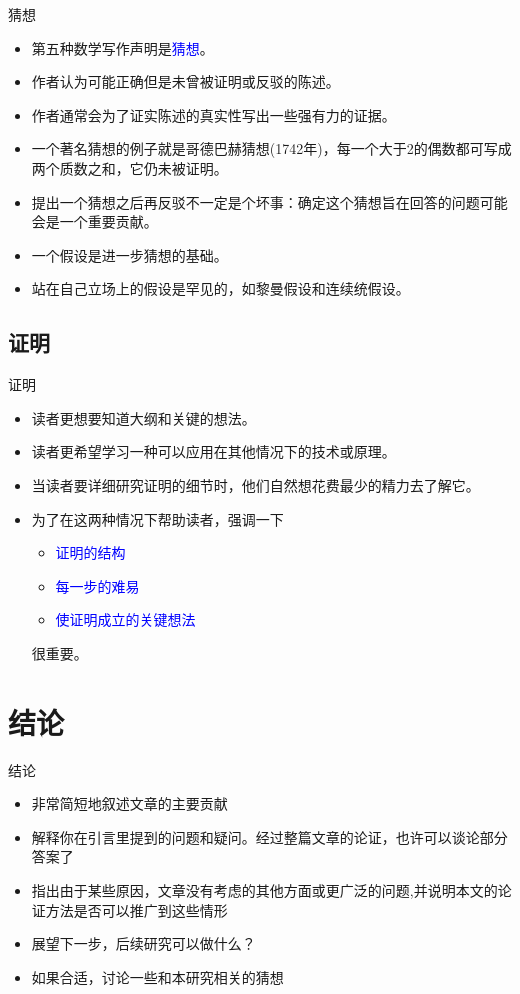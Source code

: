 \documentclass[13pt]{ctexbeamer}
\newcommand{\blue}[1]{\textcolor{blue}{#1}}
\begin{document}
\begin{frame}{猜想}
\begin{itemize}
\item 第五种数学写作声明是\blue{猜想}。
\item 作者认为可能正确但是未曾被证明或反驳的陈述。
\item 作者通常会为了证实陈述的真实性写出一些强有力的证据。
\item  一个著名猜想的例子就是哥德巴赫猜想(1742年)，每一个大于2的偶数都可写成两个质数之和，它仍未被证明。
\item 提出一个猜想之后再反驳不一定是个坏事：确定这个猜想旨在回答的问题可能会是一个重要贡献。


\item 一个假设是进一步猜想的基础。
\item 站在自己立场上的假设是罕见的，如黎曼假设和连续统假设。
\end{itemize}
\end{frame}


\subsection{证明}

\begin{frame}{证明}
	\begin{itemize}
		\item 读者更想要知道大纲和关键的想法。
		\item 读者更希望学习一种可以应用在其他情况下的技术或原理。
		\item 当读者要详细研究证明的细节时，他们自然想花费最少的精力去了解它。
		\item 为了在这两种情况下帮助读者，强调一下
		\begin{itemize}
		\item \blue{证明的结构}
		\item \blue{每一步的难易}
		\item \blue{使证明成立的关键想法}
		\end{itemize}
		很重要。

	\end{itemize}
\end{frame}




\section{结论}
\begin{frame}{结论}

	\begin{itemize}
		\item  非常简短地叙述文章的主要贡献
		\item  解释你在引言里提到的问题和疑问。经过整篇文章的论证，也许可以谈论部分答案了
		\item 指出由于某些原因，文章没有考虑的其他方面或更广泛的问题,并说明本文的论证方法是否可以推广到这些情形
		\item  展望下一步，后续研究可以做什么？
		\item 如果合适，讨论一些和本研究相关的猜想
	\end{itemize}
\end{frame}
\end{document}
